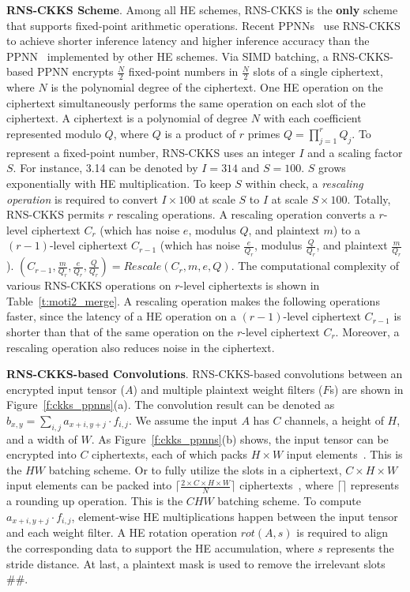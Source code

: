 \documentclass{article}
\begin{document}
\textbf{RNS-CKKS Scheme}. Among all HE schemes, RNS-CKKS is the \textbf{only} scheme that supports fixed-point arithmetic operations. Recent PPNNs~\cite{dathathri:2019PLDI,Dathathri:PLDI20:EVA} use RNS-CKKS to achieve shorter inference latency and higher inference accuracy than the PPNN~\cite{Gilad-Bachrach:ICML2016} implemented by other HE schemes. Via SIMD batching, a RNS-CKKS-based PPNN encrypts $\frac{N}{2}$ fixed-point numbers in $\frac{N}{2}$ slots of a single ciphertext, where $N$ is the polynomial degree of the ciphertext. One HE operation on the ciphertext simultaneously performs the same operation on each slot of the ciphertext. A ciphertext is a polynomial of degree $N$ with each coefficient represented modulo $Q$, where $Q$ is a product of $r$ primes $Q=\prod_{j=1}^{r}{Q_j}$. To represent a fixed-point number, RNS-CKKS uses an integer $I$ and a scaling factor $S$. For instance, 3.14 can be denoted by $I=314$ and $S=100$. $S$ grows exponentially with HE multiplication. To keep $S$ within check, a \textit{rescaling operation} is required to convert $I\times100$ at scale $S$ to $I$ at scale $S\times100$. Totally, RNS-CKKS permits $r$ rescaling operations. A rescaling operation converts a $r$-level ciphertext $C_r$ (which has noise $e$, modulus $Q$, and plaintext $m$) to a $(r-1)$-level ciphertext $C_{r-1}$ (which has noise $\frac{e}{Q_r}$, modulus $\frac{Q}{Q_r}$, and plaintext $\frac{m}{Q_r}$). $(C_{r-1}, \frac{m}{Q_r}, \frac{e}{Q_r}, \frac{Q}{Q_r})=Rescale(C_r, m, e, Q)$. The computational complexity of various RNS-CKKS operations on $r$-level ciphertexts is shown in Table~\ref{t:moti2_merge}. A rescaling operation makes the following operations faster, since the latency of a HE operation on a $(r-1)$-level ciphertext $C_{r-1}$ is shorter than that of the same operation on the $r$-level ciphertext $C_{r}$. Moreover, a rescaling operation also reduces noise in the ciphertext. 


\textbf{RNS-CKKS-based Convolutions}. RNS-CKKS-based convolutions between an encrypted input tensor ($A$) and multiple plaintext weight filters ($F$s) are shown in Figure~\ref{f:ckks_ppnns}(a). The convolution result can be denoted as $b_{x,y} = \sum_{i,j}{a_{x+i,y+j}}\cdot f_{i,j}$. We assume the input $A$ has $C$ channels, a height of $H$, and a width of $W$. As Figure~\ref{f:ckks_ppnns}(b) shows, the input tensor can be encrypted into $C$ ciphertexts, each of which packs $H\times W$ input elements~\cite{dathathri:2019PLDI}. This is the $HW$ batching scheme. Or to fully utilize the slots in a ciphertext, $C\times H\times W$ input elements can be packed into $\lceil\frac{2\times C\times H\times W}{N}\rceil$ ciphertexts~\cite{dathathri:2019PLDI}, where $\lceil \rceil$ represents a rounding up operation. This is the $CHW$ batching scheme. To compute $a_{x+i,y+j}\cdot f_{i,j}$, element-wise HE multiplications happen between the input tensor and each weight filter. A HE rotation operation $rot(A, s)$ is required to align the corresponding data to support the HE accumulation, where $s$ represents the stride distance. At last, a plaintext mask is used to remove the irrelevant slots $\#\#$.
\end{document}
